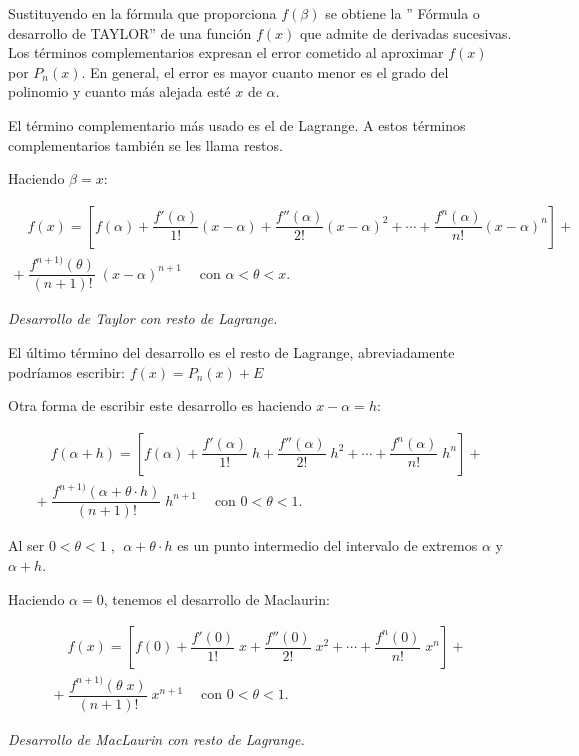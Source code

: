 	Sustituyendo en la fórmula que proporciona $f(\beta)$ se obtiene la '' Fórmula o desarrollo de TAYLOR'' de una función $f(x)$ que admite de derivadas sucesivas. Los términos complementarios expresan el error cometido al aproximar $f(x)$ por $P_n(x)$. En general, el error es mayor cuanto menor es el grado del polinomio y cuanto más alejada esté $x$ de $\alpha$.
	
	El término complementario más usado es el de Lagrange. A estos términos complementarios también se les llama restos.
	
	Haciendo $\beta=x$:
	
	\begin{equation}
		\label{Desarrollo-Taylor}
		\boxed{
		\begin{split}
		\quad f(x)=\left[f(\alpha)+\dfrac {f'(\alpha)}{1!}(x-\alpha)+\dfrac {f''(\alpha)}{2!} (x-\alpha)^2 + \cdots + \dfrac {f^{n}(\alpha)}{n!} (x-\alpha)^n    \right] + \\ 
		+\boxed{\; \dfrac {f^{n+1)}(\theta)}{(n+1)!}\; (x-\alpha)^{n+1}\; } \quad \mbox{con } \alpha < \theta <x .\quad 
		\end{split}
		}
	\end{equation} 
	\centerline{\emph{Desarrollo de Taylor con resto de Lagrange.}} 
		
	El último término del desarrollo es el resto de Lagrange, abreviadamente podríamos escribir:  $f(x)=P_n(x)+E$
	
	Otra forma de escribir este desarrollo es haciendo $x -\alpha=h$:
	
	\begin{equation}
		\label{Desarrollo-Taylor-h}
		\boxed{
		\begin{split}
		\quad f(\alpha+h)=\left[f(\alpha)+\dfrac {f'(\alpha)}{1!}\; h+\dfrac {f''(\alpha)}{2!}\; h^2 + \cdots + \dfrac {f^{n}(\alpha)}{n!} \; h^n    \right]  + \\
		+\boxed{\; \dfrac {f^{n+1)}(\alpha+\theta \cdot h)}{(n+1)!}\; h^{n+1}\; } \quad \mbox{con } 0 < \theta <1 .\quad 
		\end{split}}
	\end{equation}
	
	Al ser $0 < \theta <1 \; $, $\; \alpha+\theta\cdot h$ es un punto intermedio del intervalo de extremos $\alpha$ y $\alpha+h$.
	
	Haciendo $\alpha=0$, tenemos el desarrollo de Maclaurin:
	
	
	\begin{equation}
		\label{Desarrollo-Maclaurin}
		\boxed{
		\begin{split}
		\quad f(x)=\left[f(0)+\dfrac {f'(0)}{1!}\; x+\dfrac {f''(0)}{2!}\; x^2 + \cdots + \dfrac {f^{n}(0)}{n!} \; x^n    \right]  + \\
		+\boxed{\; \dfrac {f^{n+1)}(\theta \; x)}{(n+1)!}\; x^{n+1}\; } \quad \mbox{con } 0 < \theta <1 .\quad 
		\end{split}}
	\end{equation}
	\centerline{\emph{Desarrollo de MacLaurin con resto de Lagrange.}}
	
